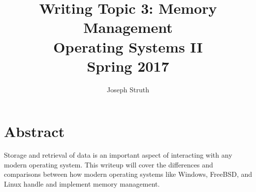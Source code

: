\documentclass[letterpaper,10pt,titlepage,draftclsnofoot,onecolumn]{IEEEtran}
\begin{document}
\title{Writing Topic 3: Memory Management\\
\large Operating Systems II \\ Spring 2017}
\author{Joseph Struth}
\begin{titlingpage}
    \maketitle
	\centering{}
\end{titlingpage}

\section{Abstract}
Storage and retrieval of data is an important aspect of interacting with any modern operating system.
This writeup will cover the differences and comparisons between how modern operating systems like Windows, FreeBSD, and Linux handle and implement memory management. 
\end{document}
